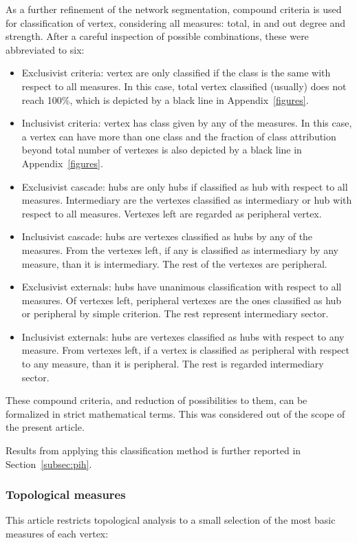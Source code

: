 \documentclass[%
 aip,
 jmp,%
 amsmath,amssymb,
 reprint,%
]{revtex4-1}
\begin{document}
As a further refinement of the network segmentation, compound criteria is used for classification of vertex, considering all measures: total, in and out degree and strength. After a careful inspection of possible combinations, these were abbreviated to six:

\begin{itemize}
    \item Exclusivist criteria: vertex are only classified if the class is the same with respect to all measures. In this case, total vertex classified (usually) does not reach 100\%, which is depicted by a black line in Appendix~\ref{figures}.
    \item Inclusivist criteria: vertex has class given by any of the measures. In this case, a vertex can have more than one class and the fraction of class attribution beyond total number of vertexes is also depicted by a black line in Appendix~\ref{figures}.
    \item Exclusivist cascade: hubs are only hubs if classified as hub with respect to all measures. Intermediary are the vertexes classified as intermediary or hub with respect to all measures. Vertexes left are regarded as peripheral vertex.
    \item Inclusivist cascade: hubs are vertexes classified as hubs by any of the measures. From the vertexes left, if any is classified as intermediary by any measure, than it is intermediary. The rest of the vertexes are peripheral.
    \item Exclusivist externals: hubs have unanimous classification with respect to all measures. Of vertexes left, peripheral vertexes are the ones classified as hub or peripheral by simple criterion. The rest represent intermediary sector.
    \item Inclusivist externals: hubs are vertexes classified as hubs with respect to any measure. From vertexes left, if a vertex is classified as peripheral with respect to any measure, than it is peripheral. The rest is regarded intermediary sector.
\end{itemize}

These compound criteria, and reduction of possibilities to them, can be formalized in strict mathematical terms. This was considered out of the scope of the present article. 

Results from applying this classification method is further reported in Section~\ref{subsec:pih}.

        \subsubsection{Topological measures}\label{measures}
This article
restricts topological analysis to a small selection of the most basic
measures of each vertex:
\end{document}
